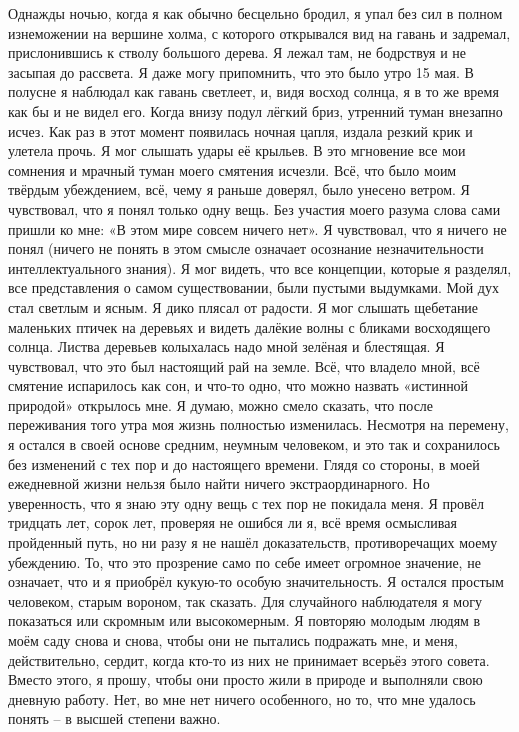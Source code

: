 \documentclass[a4paper]{book}
\begin{document}
Однажды ночью, когда я как обычно бесцельно бродил, я упал без сил в полном
изнеможении на вершине холма, с которого открывался вид на гавань и задремал,
прислонившись к стволу большого дерева. Я лежал там, не бодрствуя и не засыпая до
рассвета. Я даже могу припомнить, что это было утро 15 мая. В полусне я наблюдал как
гавань светлеет, и, видя восход солнца, я в то же время как бы и не видел его.
Когда внизу подул лёгкий бриз, утренний туман внезапно исчез. Как раз в этот момент
появилась ночная цапля, издала резкий крик и улетела прочь. Я мог слышать удары её
крыльев. В это мгновение все мои сомнения и мрачный туман моего смятения исчезли. Всё,
что было моим твёрдым убеждением, всё, чему я раньше доверял, было унесено ветром. Я
чувствовал, что я понял только одну вещь. Без участия моего разума слова сами пришли ко
мне: «В этом мире совсем ничего нет». Я чувствовал, что я ничего не понял (ничего не
понять в этом смысле означает осознание незначительности интеллектуального знания).
Я мог видеть, что все концепции, которые я разделял, все представления о самом
существовании, были пустыми выдумками. Мой дух стал светлым и ясным. Я дико плясал от
радости. Я мог слышать щебетание маленьких птичек на деревьях и видеть далёкие волны с
бликами восходящего солнца. Листва деревьев колыхалась надо мной зелёная и блестящая. Я
чувствовал, что это был настоящий рай на земле. Всё, что владело мной, всё смятение
испарилось как сон, и что-то одно, что можно назвать «истинной природой» открылось мне.
Я думаю, можно смело сказать, что после переживания того утра моя жизнь полностью
изменилась.
Несмотря на перемену, я остался в своей основе средним, неумным человеком, и это так
и сохранилось без изменений с тех пор и до настоящего времени. Глядя со стороны, в моей
ежедневной жизни нельзя было найти ничего экстраординарного. Но уверенность, что я
знаю эту одну вещь с тех пор не покидала меня. Я провёл тридцать лет, сорок лет, проверяя
не ошибся ли я, всё время осмысливая пройденный путь, но ни разу я не нашёл
доказательств, противоречащих моему убеждению.
То, что это прозрение само по себе имеет огромное значение, не означает, что и я
приобрёл кукую-то особую значительность. Я остался простым человеком, старым вороном,
так сказать. Для случайного наблюдателя я могу показаться или скромным или
высокомерным. Я повторяю молодым людям в моём саду снова и снова, чтобы они не
пытались подражать мне, и меня, действительно, сердит, когда кто-то из них не принимает
всерьёз этого совета. Вместо этого, я прошу, чтобы они просто жили в природе и выполняли
свою дневную работу. Нет, во мне нет ничего особенного, но то, что мне удалось понять – в
высшей степени важно.
\end{document}
